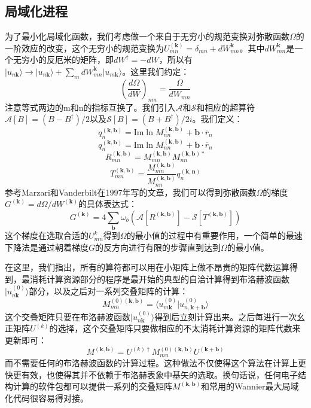 \subsection{局域化进程}
为了最小化局域化函数，我们考虑做一个来自于无穷小的规范变换对弥散函数$\Omega$的一阶效应的改变，这个无穷小的规范变换为$U^{(\bm{k})}_{mn}=\delta_{mn}+dW_{mn}^{\bm{k}}$。其中$dW_{mn}^{\bm{k}}$是一个无穷小的反厄米的矩阵，即$dW^\dagger=-dW$，所以有$|u_{n\bm{k}}\rangle\rightarrow |u_{n\bm{k}}\rangle+\sum_mdW_{mn}^{\bm{k}}|u_{m\bm{k}}\rangle$。这里我们约定：
\begin{equation}
(\frac{d\Omega}{dW})_{nm}=\frac{\Omega}{dW_{mn}}
\end{equation}
注意等式两边的m和n的指标互换了。我们引入$\mathcal{A}$和$\mathcal{S}$和相应的超算符 $\mathcal{A}[B]=(B-B^\dagger)/2$以及$\mathcal{S}[B]=(B+B^\dagger)/2i$。我们定义：
\begin{equation}
q^{(\bm{k},\bm{b})}_n=\text{Im} \ln M^{(\bm{k},\bm{b})}_{nn}+\bm{b} \cdot \overline r_n
\end{equation}
\begin{equation}
q^{(\bm{k},\bm{b})}_n=\text{Im} \ln M^{(\bm{k},\bm{b})}_{nn}+\bm{b} \cdot \overline r_n
\end{equation}
\begin{equation}
R^{(\bm{k},\bm{b})}_{mn}= M^{(\bm{k},\bm{b})}_{mn}M^{(\bm{k},\bm{b})\ast}_{nn}
\end{equation}
\begin{equation}
T^{(\bm{k},\bm{b})}_{mn}= \frac{M^{(\bm{k},\bm{b})}_{mn}}{M^{(\bm{k},\bm{b})}_{nn}}q^{(\bm{k},\bm{n})}_n
\end{equation}
参考Marzari和Vanderbilt在1997年写的文章，我们可以得到弥散函数$\Omega$的梯度$G^{(\bm{k})}=d\Omega /dW^{(\bm{k})}$的具体表达式：
\begin{equation}
G^{(\bm{k})}=4\sum_{\bm{b}}\omega_b(\mathcal{A}[R^{(\bm{k},\bm{b})}]-\mathcal{S}[T^{(\bm{k},\bm{b})}])
\end{equation}
这个梯度在选取合适的$U_{mn}^{k}$得到$\Omega$的最小值的过程中有重要作用，一个简单的最速下降法是通过朝着梯度$G$的反方向进行有限的步骤直到达到$\Omega$的最小值。

在这里，我们指出，所有的算符都可以用在小矩阵上做不昂贵的矩阵代数运算得到，最消耗计算资源部分的程序是最开始的典型的自洽计算得到布洛赫波函数$|u^{(0)}_{n\bm{k}}\rangle$部分，以及之后对一系列交叠矩阵的计算：
\begin{equation}
M_{mn}^{(0)(\bm{k},\bm{b})}=\langle u_{m\bm{k}}^{(0)}|u^{(0)}_{n,\bm{k+b}}\rangle
\end{equation}
这个交叠矩阵只要在布洛赫波函数$|u^{(0)}_{n\bm{k}}\rangle$得到后立刻计算出来。之后每进行一次幺正矩阵$U^{(k)}$的选择，这个交叠矩阵只要做相应的不太消耗计算资源的矩阵代数来更新即可：
\begin{equation}
M^{(\bm{k},\bm{b})}=U^{(k)\dagger}M_{mn}^{(0)(\bm{k},\bm{b})}U^{\bm{(k+b)}}
\end{equation}
而不需要任何的布洛赫波函数的计算过程。这种做法不仅使得这个算法在计算上更快更有效，也使得其并不依赖于布洛赫表象中基矢的选取。换句话说，任何电子结构计算的软件包都可以提供一系列的交叠矩阵$M^{(\bm{k},\bm{b})}$和常用的Wannier最大局域化代码很容易得对接。
